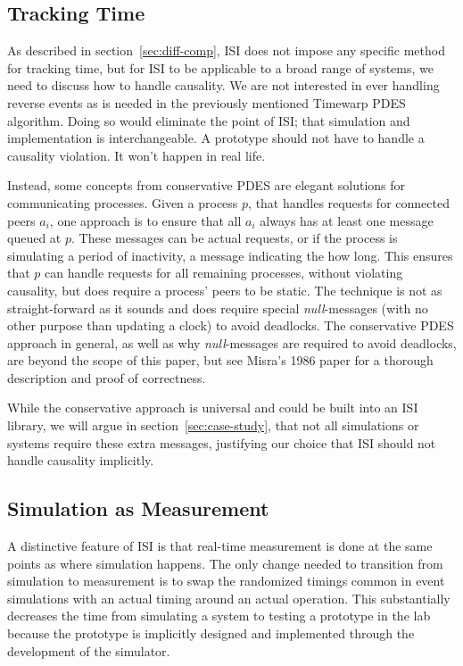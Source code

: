 \subsection{Tracking Time}
\label{sec:tracking-time}
As described in section~\ref{sec:diff-comp}, ISI does not impose any specific
method for tracking time, but for ISI to be applicable to a broad range of
systems, we need to discuss how to handle causality. We are not interested in
ever handling reverse events as is needed in the previously mentioned Timewarp
PDES algorithm.  Doing so would eliminate the point of ISI; that simulation and
implementation is interchangeable. A prototype should not have to handle a
causality violation. It won't happen in real life.

Instead, some concepts from conservative PDES are elegant solutions for
communicating processes. Given a process $p$, that handles
requests for connected peers $a_i$, one approach is to ensure that all $a_i$
always has at least one message queued at $p$. These messages can be actual
requests, or if the process is simulating a period of inactivity, a
message indicating the how long. This ensures that $p$
can handle requests for all remaining processes, without violating causality,
but does require a process' peers to be static. The technique is not as
straight-forward as it sounds and does require special \emph{null}-messages
(with no other purpose than updating a clock) to avoid deadlocks. The
conservative PDES approach in general, as well as why \emph{null}-messages are
required to avoid deadlocks, are beyond the scope of this paper, but see Misra's
1986 paper\cite{dist-des} for a thorough description and proof of correctness.

While the conservative approach is universal and could be built into an ISI
library, we will argue in section~\ref{sec:case-study}, that not all
simulations or systems require these extra messages, justifying our choice that
ISI should not handle causality implicitly.

\subsection{Simulation as Measurement}
A distinctive feature of ISI is that real-time measurement is done at the same
points as where simulation happens. The only change needed to transition from
simulation to measurement is to swap the randomized timings common in event
simulations with an actual timing around an actual operation. This
substantially decreases the time from simulating a system to testing a
prototype in the lab because the prototype is implicitly designed and
implemented through the development of the simulator.

